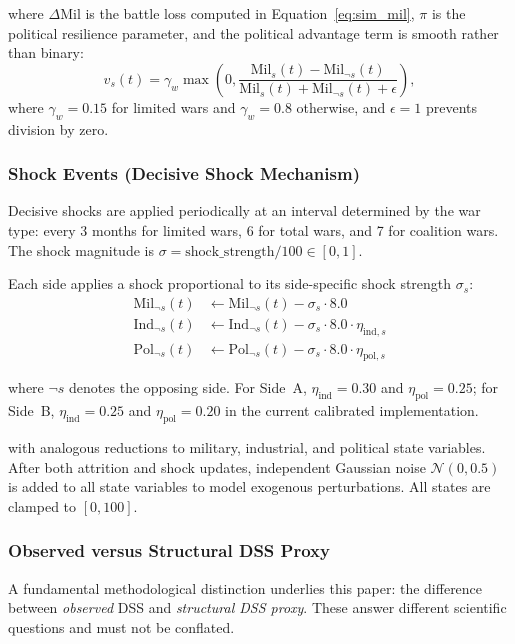 \noindent where $\Delta\text{Mil}$ is the battle loss computed in Equation~\ref{eq:sim_mil}, $\pi$ is the political resilience parameter, and the political advantage term is smooth rather than binary:
\[
v_s(t)=\gamma_w \max\left(0,\frac{\text{Mil}_s(t)-\text{Mil}_{\neg s}(t)}{\text{Mil}_s(t)+\text{Mil}_{\neg s}(t)+\epsilon}\right),
\]
where $\gamma_w=0.15$ for limited wars and $\gamma_w=0.8$ otherwise, and $\epsilon=1$ prevents division by zero.

\subsubsection{Shock Events (Decisive Shock Mechanism)}

Decisive shocks are applied periodically at an interval determined by the war type: every 3 months for limited wars, 6 for total wars, and 7 for coalition wars. The shock magnitude is $\sigma = \text{shock\_strength} / 100 \in [0, 1]$.

Each side applies a shock proportional to its side-specific shock strength $\sigma_s$:
\begin{align}
\text{Mil}_{\neg s}(t) &\leftarrow \text{Mil}_{\neg s}(t) - \sigma_s \cdot 8.0 \\
\text{Ind}_{\neg s}(t) &\leftarrow \text{Ind}_{\neg s}(t) - \sigma_s \cdot 8.0 \cdot \eta_{\text{ind},s} \\
\text{Pol}_{\neg s}(t) &\leftarrow \text{Pol}_{\neg s}(t) - \sigma_s \cdot 8.0 \cdot \eta_{\text{pol},s}
\end{align}

\noindent where $\neg s$ denotes the opposing side. For Side~A, $\eta_{\text{ind}}=0.30$ and $\eta_{\text{pol}}=0.25$; for Side~B, $\eta_{\text{ind}}=0.25$ and $\eta_{\text{pol}}=0.20$ in the current calibrated implementation.

\noindent with analogous reductions to military, industrial, and political state variables. After both attrition and shock updates, independent Gaussian noise $\mathcal{N}(0, 0.5)$ is added to all state variables to model exogenous perturbations. All states are clamped to $[0, 100]$.

\subsubsection{Observed versus Structural DSS Proxy}

A fundamental methodological distinction underlies this paper: the difference between \emph{observed} DSS and \emph{structural DSS proxy}. These answer different scientific questions and must not be conflated.

